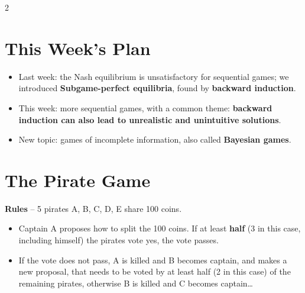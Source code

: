 \documentclass[a4paper,9pt]{extarticle}
\begin{document}

\thispagestyle{fancy}



\begin{multicols}{2}



\section{This Week's Plan}


\begin{important}

\begin{itemize}

\item Last week: the Nash equilibrium is unsatisfactory for sequential games; we introduced
\textbf{Subgame-perfect equilibria}, found by \textbf{backward induction}.

\item This week: more sequential games, with a common theme: \textbf{backward induction can
also lead to unrealistic and unintuitive solutions}.

\item New topic: games of incomplete information, also called \textbf{Bayesian games}.

\end{itemize}

\end{important}



\section{The Pirate Game}


\begin{example}

\textbf{Rules} -- 5 pirates A, B, C, D, E share 100 coins.

\begin{itemize}

\item Captain A proposes how to split the 100 coins. If at least \textbf{half} (3 in this
case, including himself) the pirates vote yes, the vote passes.

\item If the vote does not pass, A is killed and B becomes captain, and makes a new proposal,
that needs to be voted by at least half (2 in this case) of the remaining pirates, otherwise B
is killed and C becomes captain\dots


\end{itemize}
\end{example}
\end{multicols}
\end{document}
